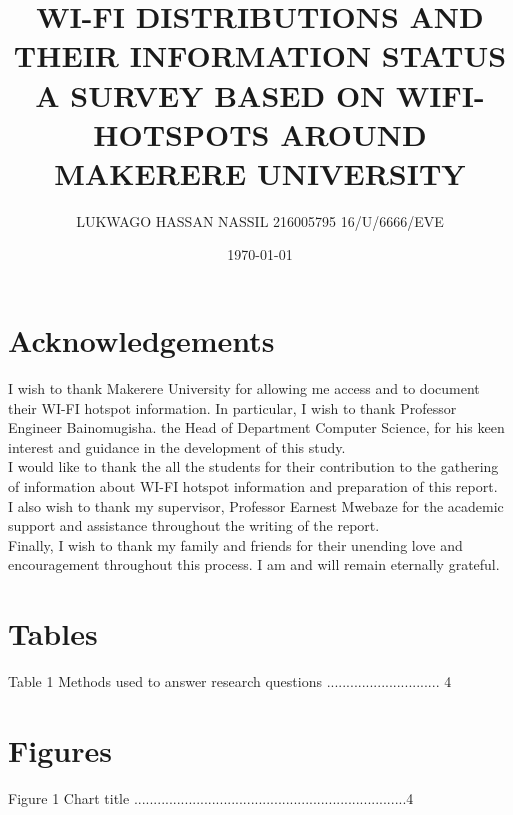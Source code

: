\documentclass[14pt, a4paper]{article}
\begin{document}
		
				
		\title{\textbf{ WI-FI DISTRIBUTIONS AND THEIR INFORMATION STATUS}\\A SURVEY BASED ON WIFI-HOTSPOTS AROUND MAKERERE UNIVERSITY }

		
		\author{LUKWAGO HASSAN NASSIL  216005795 16/U/6666/EVE}

		\date {\today}

		\maketitle

			\section{Acknowledgements}
I wish to thank Makerere University for allowing me access and to document their WI-FI hotspot information.  In particular, I wish to thank Professor Engineer Bainomugisha.  the Head of Department Computer Science, for his keen interest and guidance in the development of this study.\\



I would like to thank the all the students  for their contribution to the gathering of information about WI-FI hotspot information and preparation of this report.\\



I also wish to thank my supervisor, Professor Earnest Mwebaze for the academic support and assistance throughout the writing of the report.\\



Finally, I wish to thank my family and friends for their unending love and encouragement throughout this process.  I am and will remain eternally grateful.\\


		\tableofcontents


			\section{Tables}
Table 1 Methods used to answer research questions	............................. 4\\


			\section{Figures}
Figure 1 Chart title	......................................................................4\\
\end{document}
